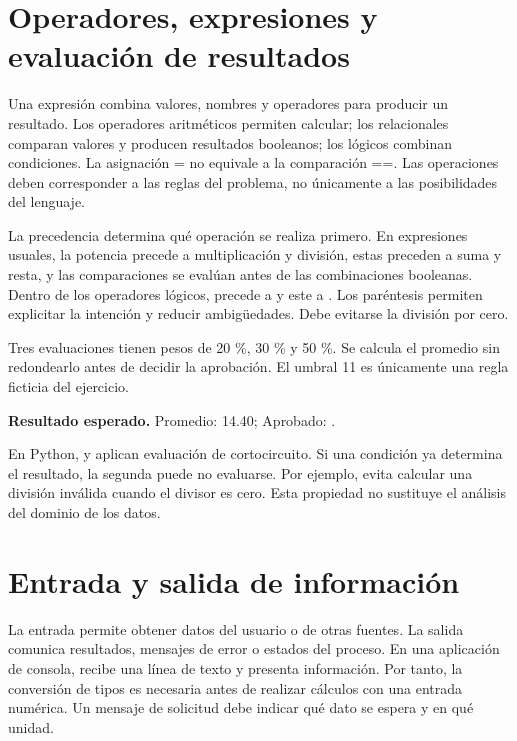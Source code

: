 \section{Operadores, expresiones y evaluación de resultados}

Una expresión combina valores, nombres y operadores para producir un resultado. Los operadores aritméticos permiten calcular; los relacionales comparan valores y producen resultados booleanos; los lógicos combinan condiciones. La asignación = no equivale a la comparación ==. Las operaciones deben corresponder a las reglas del problema, no únicamente a las posibilidades del lenguaje.



La precedencia determina qué operación se realiza primero. En expresiones usuales, la potencia precede a multiplicación y división, estas preceden a suma y resta, y las comparaciones se evalúan antes de las combinaciones booleanas. Dentro de los operadores lógicos,  precede a  y este a . Los paréntesis permiten explicitar la intención y reducir ambigüedades. Debe evitarse la división por cero.


Tres evaluaciones tienen pesos de 20 \%, 30 \% y 50 \%. Se calcula el promedio sin redondearlo antes de decidir la aprobación. El umbral 11 es únicamente una regla ficticia del ejercicio.


\textbf{Resultado esperado.} Promedio: 14.40; Aprobado: .

En Python,  y  aplican evaluación de cortocircuito. Si una condición ya determina el resultado, la segunda puede no evaluarse. Por ejemplo,  evita calcular una división inválida cuando el divisor es cero. Esta propiedad no sustituye el análisis del dominio de los datos.

\section{Entrada y salida de información}

La entrada permite obtener datos del usuario o de otras fuentes. La salida comunica resultados, mensajes de error o estados del proceso. En una aplicación de consola,  recibe una línea de texto y  presenta información. Por tanto, la conversión de tipos es necesaria antes de realizar cálculos con una entrada numérica. Un mensaje de solicitud debe indicar qué dato se espera y en qué unidad.

